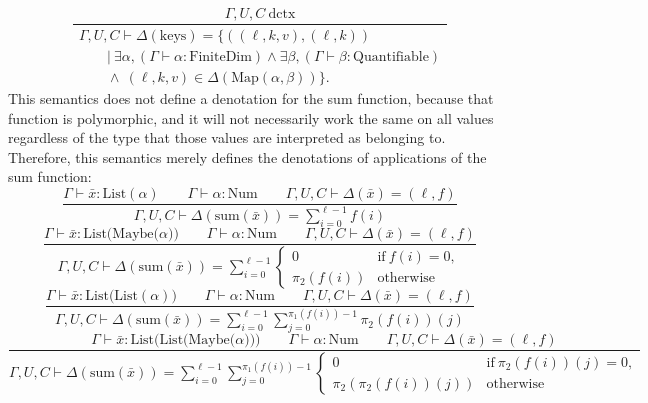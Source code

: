 \documentclass[11pt]{article}
\begin{document}
\begin{equation}
	\frac{\Gamma,U,C\ \text{dctx}}
	{\begin{array}{l}
		\Gamma,U,C \vdash \Delta(\text{keys})
		= \{((\ell,k,v),(\ell,k))
		\\ \qquad |\ \exists \alpha, (\Gamma \vdash \alpha : \text{FiniteDim})
		\wedge \exists \beta, (\Gamma \vdash \beta : \text{Quantifiable})
		\\ \qquad \wedge\ (\ell,k,v) \in \Delta(\text{Map}(\alpha, \beta))\}.
	\end{array}}
\end{equation}
This semantics does not define a denotation for the sum function, because
that function is polymorphic, and it will not necessarily
work the same on all values regardless of the type that those values
are interpreted as belonging to. Therefore, this semantics merely defines the
denotations of applications of the sum function:
\begin{equation}
	\frac{
		\Gamma \vdash \bar{x} : \text{List}(\alpha)
		\qquad \Gamma \vdash \alpha : \text{Num}
		\qquad \Gamma,U,C \vdash \Delta(\bar{x}) = (\ell, f)
	}{
		\Gamma,U,C \vdash \Delta(\text{sum}(\bar{x}))
		= \sum_{i=0}^{\ell-1} f(i)
	}
\end{equation}
\begin{equation}
	\frac{
		\Gamma \vdash \bar{x} : \text{List(Maybe(}\alpha))
		\qquad \Gamma \vdash \alpha : \text{Num}
		\qquad \Gamma,U,C \vdash \Delta(\bar{x}) = (\ell,f)
	}{
		\Gamma,U,C \vdash \Delta(\text{sum}(\bar{x}))
		= \sum\limits_{i=0}^{\ell-1}
		\begin{cases}
			0 & \text{if}\ f(i) = 0, \\
			\pi_2(f(i)) & \text{otherwise}
		\end{cases}
	}
\end{equation}
\begin{equation}
	\frac{
		\Gamma \vdash \bar{x} : \text{List(List}(\alpha))
		\qquad \Gamma \vdash \alpha : \text{Num}
		\qquad \Gamma,U,C \vdash \Delta(\bar{x}) = (\ell, f)
	}{
		\Gamma,U,C \vdash \Delta(\text{sum}(\bar{x}))
		= \sum_{i=0}^{\ell-1} \sum_{j=0}^{\pi_1(f(i))-1} \pi_2(f(i))(j)
	}
\end{equation}
\begin{equation}
	\frac{
		\Gamma \vdash \bar{x} : \text{List(List(Maybe(}\alpha)))
		\qquad \Gamma \vdash \alpha : \text{Num}
		\qquad \Gamma,U,C \vdash \Delta(\bar{x}) = (\ell,f)
	}{
		\Gamma,U,C \vdash \Delta(\text{sum}(\bar{x}))
		= \sum\limits_{i=0}^{\ell-1} \sum\limits_{j=0}^{\pi_1(f(i))-1}
		\begin{cases}
			0 & \text{if}\ \pi_2(f(i))(j) = 0, \\
			\pi_2(\pi_2(f(i))(j)) & \text{otherwise}
		\end{cases}
	}
\end{equation}
\end{document}
